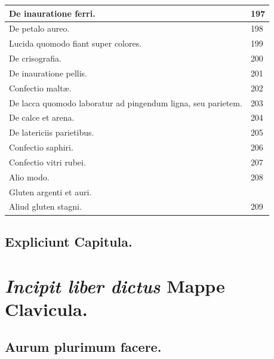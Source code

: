 \documentclass[a4paper, 11pt, oneside, polutonikogreek, italian]{article}
\begin{document}
\begin{center}
\begin{longtable}{|p{60mm}|l|}
         De inauratione ferri.                                                           & 197 \\ \hline
         De petalo aureo.                                                                & 198 \\ \hline
         Lucida quomodo fiant super colores.                                             & 199 \\ \hline
         De crisografia.                                                                 & 200 \\ \hline
         De inauratione pellis.                                                          & 201 \\ \hline
         Confectio maltæ.                                                                & 202 \\ \hline
         De lacca quomodo laboratur ad pingendum ligna, seu parietem.                    & 203 \\ \hline
         De calce et arena.                                                              & 204 \\ \hline
         De latericiis parietibus.                                                       & 205 \\ \hline
         Confectio saphiri.                                                              & 206 \\ \hline
         Confectio vitri rubei.                                                          & 207 \\ \hline
         Alio modo.                                                                      & 208 \\ \hline
         Gluten argenti et auri.                                                         & ~ \\ \hline
         Aliud gluten stagni.                                                            & 209 \\ \hline
    \end{longtable}
\end{center}
\subsection*{Expliciunt Capitula.}
\clearpage
\section{\emph{Incipit liber dictus} Mappe Clavicula.}
\subsection{Aurum plurimum facere.}
\end{document}
